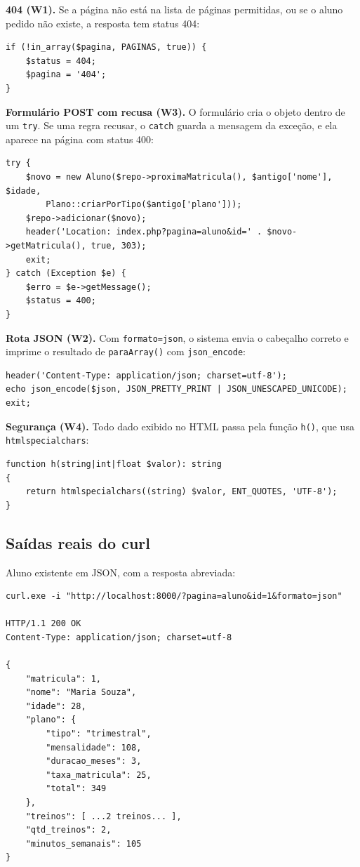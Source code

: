 \documentclass[12pt,a4paper]{article}
\begin{document}
\textbf{404 (W1).} Se a página não está na lista de páginas permitidas, ou se o aluno pedido não existe, a resposta tem status 404:

\begin{lstlisting}
if (!in_array($pagina, PAGINAS, true)) {
    $status = 404;
    $pagina = '404';
}
\end{lstlisting}

\textbf{Formulário POST com recusa (W3).} O formulário cria o objeto dentro de um \texttt{try}. Se uma regra recusar, o \texttt{catch} guarda a mensagem da exceção, e ela aparece na página com status 400:

\begin{lstlisting}
try {
    $novo = new Aluno($repo->proximaMatricula(), $antigo['nome'], $idade,
        Plano::criarPorTipo($antigo['plano']));
    $repo->adicionar($novo);
    header('Location: index.php?pagina=aluno&id=' . $novo->getMatricula(), true, 303);
    exit;
} catch (Exception $e) {
    $erro = $e->getMessage();
    $status = 400;
}
\end{lstlisting}

\textbf{Rota JSON (W2).} Com \texttt{formato=json}, o sistema envia o cabeçalho correto e imprime o resultado de \texttt{paraArray()} com \texttt{json\_encode}:

\begin{lstlisting}
header('Content-Type: application/json; charset=utf-8');
echo json_encode($json, JSON_PRETTY_PRINT | JSON_UNESCAPED_UNICODE);
exit;
\end{lstlisting}

\textbf{Segurança (W4).} Todo dado exibido no HTML passa pela função \texttt{h()}, que usa \texttt{htmlspecialchars}:

\begin{lstlisting}
function h(string|int|float $valor): string
{
    return htmlspecialchars((string) $valor, ENT_QUOTES, 'UTF-8');
}
\end{lstlisting}

\subsection{Saídas reais do curl}

Aluno existente em JSON, com a resposta abreviada:

\begin{lstlisting}
curl.exe -i "http://localhost:8000/?pagina=aluno&id=1&formato=json"

HTTP/1.1 200 OK
Content-Type: application/json; charset=utf-8

{
    "matricula": 1,
    "nome": "Maria Souza",
    "idade": 28,
    "plano": {
        "tipo": "trimestral",
        "mensalidade": 108,
        "duracao_meses": 3,
        "taxa_matricula": 25,
        "total": 349
    },
    "treinos": [ ...2 treinos... ],
    "qtd_treinos": 2,
    "minutos_semanais": 105
}
\end{lstlisting}
\end{document}
